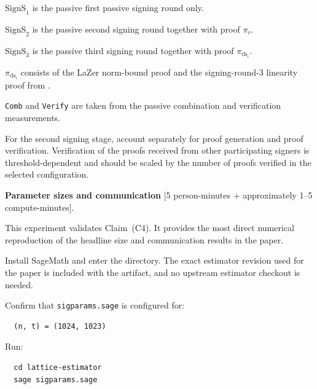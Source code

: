 \documentclass[nonacm,sigconf]{acmart}
\begin{document}
\begin{compactitem}
\begin{asparadesc}
    \begin{compactitem}
      \item $\mathrm{SignS}_1$ is the passive first passive signing round only.
      \item $\mathrm{SignS}_2$ is the passive second signing round together with proof $\pi_r$.
      \item $\mathrm{SignS}_3$ is the passive third signing round together with proof $\pi_{\mathrm{ds}_i}$.
      \item $\pi_{\mathrm{ds}_i}$ consists of the LaZer  norm-bound proof and the signing-round-3 linearity proof from .
      \item \texttt{Comb} and \texttt{Verify} are taken from the passive combination and verification measurements.
    \end{compactitem}

    For the second signing stage, account separately for proof generation and proof verification. Verification of the proofs received from other participating signers is threshold-dependent and should be scaled by the number of proofs verified in the selected configuration.
  \end{asparadesc}

  \item[(E4):] \textbf{Parameter sizes and communication} [5 person-minutes + approximately 1--5 compute-minutes].

  This experiment validates Claim~(C4). It provides the most direct numerical reproduction of the headline size and communication results in the paper.

  \begin{asparadesc}
    \item[Preparation:] Install SageMath and enter the  directory. The exact estimator revision used for the paper is included with the artifact, and no upstream estimator checkout is needed.

    Confirm that \texttt{sigparams.sage} is configured for:

\begin{verbatim}
  (n, t) = (1024, 1023)
\end{verbatim}

    \item[Execution:] Run:

\begin{verbatim}
  cd lattice-estimator
  sage sigparams.sage
\end{verbatim}


\end{asparadesc}
\end{compactitem}
\end{document}

